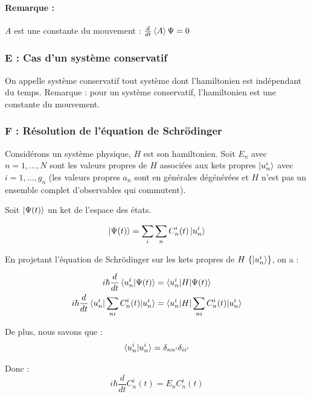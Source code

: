 \documentclass[12pt,a4paper,titlepage]{book}
\begin{document}
\paragraph*{Remarque :}

$A$ est une constante du mouvement : $\frac{d}{dt} \braket{A}\Psi = 0$

\subsubsection{E : Cas d'un système conservatif}
On appelle système conservatif tout système dont l'hamiltonien est indépendant du temps. Remarque : pour un système conservatif, l'hamiltonien est une constante du mouvement.
\subsubsection{F : Résolution de l'équation de Schrödinger}
Considérons un système physique, $H$ est son hamiltonien. Soit $E_n$ avec $n = 1, \ldots, N$ sont les valeurs propres de $H$ associées aux kets propres $\ket{u_n^i}$ avec $i = 1, \ldots, g_n$ (les valeurs propres $a_n$ sont en générales dégénérées et $H$ n'est pas un ensemble complet d'observables qui commutent).

Soit $\ket{\Psi (t)}$ un ket de l'espace des états.

\begin{equation*}
\ket{\Psi (t)} = \sum\limits_i \sum\limits_n C_n^i (t) \ket{u_n^i}
\end{equation*}

En projetant l'équation de Schrödinger sur les kets propres de $H~\lbrace \ket{u_n^i} \rbrace$, on a :

\begin{align*}
i \hbar \frac{d}{dt} \braket{u_n^i | \Psi (t)} &= \braket{ u_n^i | H | \Psi (t)}\\
i \hbar \frac{d}{dt} \braket{u_n^i | \sum\limits_{n i} C_n^i (t) | u_n^i} &= \braket{ u_n^i | H | \sum\limits_{n i} C_n^i (t) | u_n^i}
\end{align*}

De plus, nous savons que :
\begin{equation*}
\braket{u_n^i | u_n^i} = \delta_{nn'} \delta_{ii'}
\end{equation*}

Donc : 
\begin{equation*}
i \hbar \frac{d}{dt} C_n^i (t) = E_n C_n^i (t)
\end{equation*}
\end{document}
